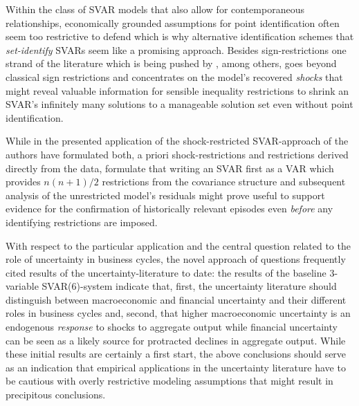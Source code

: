 \documentclass[a4paper,11pt,listof=nochaptergap,oneside,pointednumbers,bibtotoc,bigheadings,liststotoc,hidelinks]{scrbook}
\theoremstyle{mysatz}
\theoremstyle{mydefinition}
\theoremstyle{mytheorem}
\theoremstyle{mybemerkung}
\begin{document}
Within the class of SVAR models that also allow for contemporaneous relationships, economically grounded assumptions for point identification often seem too restrictive to defend which is why alternative identification schemes that \textit{set-identify} \citep{granzieraetal:18} SVARs seem like a promising approach. Besides sign-restrictions one strand of the literature which is being pushed by \citet{ludvigsonetal:20a}, among others, goes beyond classical sign restrictions and concentrates on the model's recovered \textit{shocks} that might reveal valuable information for sensible inequality restrictions to shrink an SVAR's infinitely many solutions to a manageable solution set even without point identification. 

While in the presented application of the shock-restricted SVAR-approach of \citet{ludvigsonetal:19} the authors have formulated both, a priori shock-restrictions and restrictions derived directly from the data, \citet{ludvigsonetal:20a} formulate that writing an SVAR first as a VAR which provides $n(n+1)/2$ restrictions from the covariance structure and subsequent analysis of the unrestricted model's residuals might prove useful to support evidence for the confirmation of historically relevant episodes even \textit{before} any identifying restrictions are imposed.

With respect to the particular application and the central question related to the role of uncertainty in business cycles, the novel approach of \citet{ludvigsonetal:18, ludvigsonetal:19} questions frequently cited results of the uncertainty-literature to date: the results of the baseline 3-variable SVAR(6)-system indicate that, first, the uncertainty literature should distinguish between macroeconomic and financial uncertainty and their different roles in business cycles and, second, that higher macroeconomic uncertainty is an endogenous \textit{response} to shocks to aggregate output while financial uncertainty can be seen as a likely source for protracted declines in aggregate output. While these initial results are certainly a first start, the above conclusions should serve as an indication that empirical applications in the uncertainty literature have to be cautious with overly restrictive modeling assumptions that might result in precipitous conclusions.
\end{document}

